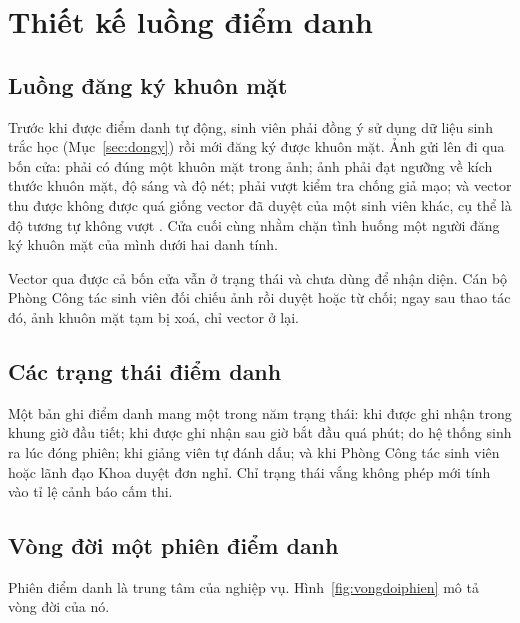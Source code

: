 \section{Thiết kế luồng điểm danh}

\subsection{Luồng đăng ký khuôn mặt}

Trước khi được điểm danh tự động, sinh viên phải đồng ý sử dụng dữ liệu sinh
trắc học (Mục~\ref{sec:dongy}) rồi mới đăng ký được khuôn mặt. Ảnh gửi lên đi
qua bốn cửa: phải có đúng một khuôn mặt trong ảnh; ảnh phải đạt ngưỡng
về kích thước khuôn mặt, độ sáng và độ nét; phải vượt kiểm tra chống giả mạo;
và vector thu được không được quá giống vector đã duyệt của một sinh viên
khác, cụ thể là độ tương tự không vượt \FnguongTrung. Cửa cuối cùng nhằm chặn
tình huống một người đăng ký khuôn mặt của mình dưới hai danh tính.

Vector qua được cả bốn cửa vẫn ở trạng thái  và chưa dùng để
nhận diện. Cán bộ Phòng Công tác sinh viên đối chiếu ảnh rồi duyệt hoặc từ
chối; ngay sau thao tác đó, ảnh khuôn mặt tạm bị xoá, chỉ vector ở lại.

\subsection{Các trạng thái điểm danh}

Một bản ghi điểm danh mang một trong năm trạng thái:  khi được
ghi nhận trong khung giờ đầu tiết;  khi được ghi nhận sau giờ bắt
đầu quá \FphutMuon{} phút;  do hệ thống sinh ra lúc đóng phiên;
 khi giảng viên tự đánh dấu; và  khi Phòng
Công tác sinh viên hoặc lãnh đạo Khoa duyệt đơn nghỉ. Chỉ trạng thái vắng
không phép mới tính vào tỉ lệ cảnh báo cấm thi.

\subsection{Vòng đời một phiên điểm danh}

Phiên điểm danh là trung tâm của nghiệp vụ. Hình~\ref{fig:vongdoiphien} mô tả
vòng đời của nó.

